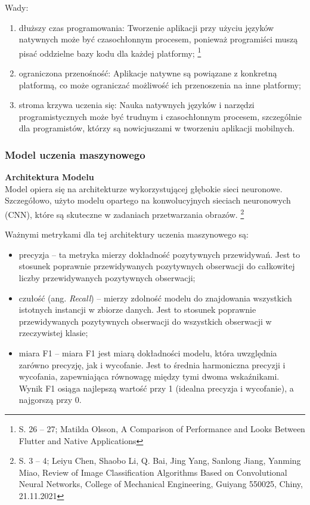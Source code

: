 \documentclass[12pt, a4paper, twoside, openany]{book}
\newcommand{\forceindent}{\leavevmode{\parindent=1.3em\indent}}
\begin{document}
Wady:
\begin{enumerate}[label=--]
    \item dłuższy czas programowania: Tworzenie aplikacji przy użyciu języków natywnych może być czasochłonnym procesem, ponieważ programiści muszą pisać oddzielne bazy kodu dla każdej platformy; \footnote{S. 26 -- 27; Matilda Olsson, A Comparison of Performance and Looks Between Flutter and Native Applications}
    \item ograniczona przenośność: Aplikacje natywne są powiązane z konkretną platformą, co może ograniczać możliwość ich przenoszenia na inne platformy;
    \item stroma krzywa uczenia się: Nauka natywnych języków i narzędzi programistycznych może być trudnym i czasochłonnym procesem, szczególnie dla programistów, którzy są nowicjuszami w tworzeniu aplikacji mobilnych.
\end{enumerate}

\subsubsection{Model uczenia maszynowego}

\forceindent \textbf{Architektura Modelu\\}
\indent Model opiera się na architekturze wykorzystującej głębokie sieci neuronowe.
Szczegółowo, użyto modelu opartego na konwolucyjnych sieciach neuronowych (CNN), które są skuteczne w zadaniach przetwarzania obrazów. \footnote{
    S. 3 -- 4; Leiyu Chen, Shaobo Li, Q. Bai, Jing Yang, Sanlong Jiang, Yanming Miao, Review of Image Classification Algorithms Based on Convolutional Neural Networks, College of Mechanical Engineering, Guiyang 550025, Chiny, 21.11.2021
}

Ważnymi metrykami dla tej architektury uczenia maszynowego są:
\begin{itemize}[label=--]
    \item precyzja -- ta metryka mierzy dokładność pozytywnych przewidywań. Jest to stosunek poprawnie przewidywanych pozytywnych obserwacji do całkowitej liczby przewidywanych pozytywnych obserwacji;
    \item czułość (ang. \textit{Recall}) -- mierzy zdolność modelu do znajdowania wszystkich istotnych instancji w zbiorze danych. Jest to stosunek poprawnie przewidywanych pozytywnych obserwacji do wszystkich obserwacji w rzeczywistej klasie;
    \item miara F1 -- miara F1 jest miarą dokładności modelu, która uwzględnia zarówno precyzję, jak i wycofanie. Jest to średnia harmoniczna precyzji i wycofania, zapewniająca równowagę między tymi dwoma wskaźnikami. Wynik F1 osiąga najlepszą wartość przy 1 (idealna precyzja i wycofanie), a najgorszą przy 0.
\end{itemize}
\end{document}
